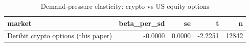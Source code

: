 \begin{table}
\caption{Demand-pressure elasticity: crypto vs US equity options}
\label{tab:t8_elasticity_comparison}
\begin{tabular}{lrrrr}
\toprule
market & beta\_per\_sd & se & t & n \\
\midrule
Deribit crypto options (this paper) & -0.0000 & 0.0000 & -2.2251 & 12842 \\
\bottomrule
\end{tabular}
\end{table}
